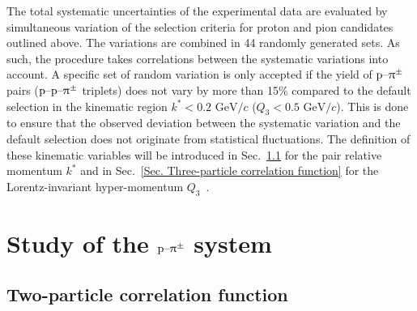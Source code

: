 \documentclass[ALICE,manyauthors]{cernphprep}
\begin{document}
The total systematic uncertainties of the experimental data are evaluated by simultaneous variation of the selection criteria for proton and pion candidates outlined above. The variations are combined in 44 randomly generated sets. As such, the procedure takes correlations between the systematic variations into account. A specific set of random variation is only accepted if the yield of $\text{p--}\uppi^\pm$ pairs ($\text{p--p--}\uppi^\pm$ triplets) does not vary by more than 15\% compared to the default selection in the kinematic region $k^* < 0.2 \text{ GeV}/c$ ($Q_3 < 0.5 \text{ GeV}/c$). This is done to ensure that the observed deviation between the systematic variation and the default selection does not originate from statistical fluctuations. The definition of these kinematic variables will be introduced in Sec.~\ref{Sec. Two-Particle Correlation} for the pair relative momentum $k^*$ and in Sec.~\ref{Sec. Three-particle correlation function} for the Lorentz-invariant hyper-momentum $Q_3$~\cite{ALICE:3pi}.

\section{Study of the \texorpdfstring{$\mathbf{\text{p--}\uppi^\pm}$}{proton--pion} system}\label{Sec. Study of the ppi system}

\subsection{Two-particle correlation function}
\label{Sec. Two-Particle Correlation}
\end{document}

